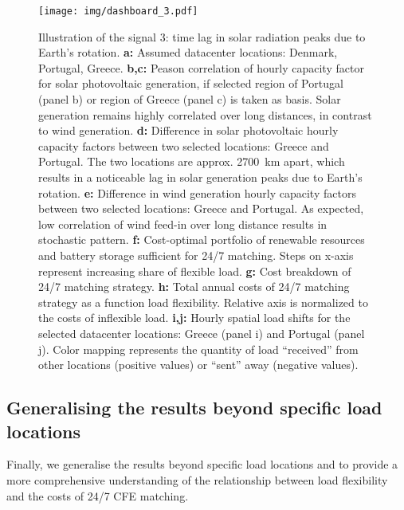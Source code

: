 \begin{figure}
    \centering
    \texttt{[image: img/dashboard\_3.pdf]}
    \caption{Illustration of the signal 3: time lag in solar radiation peaks due to Earth's rotation.
    \textbf{a:} Assumed datacenter locations: Denmark, Portugal, Greece.
    \textbf{b,c:} Peason correlation of hourly capacity factor for solar photovoltaic generation, if selected region of Portugal (panel b) or region of Greece (panel c) is taken as basis. Solar generation remains highly correlated over long distances, in contrast to wind generation.
    \textbf{d:} Difference in solar photovoltaic hourly capacity factors between two selected locations: Greece and Portugal. The two locations are approx. 2700~km apart, which results in a noticeable lag in solar generation peaks due to Earth's rotation.
    \textbf{e:} Difference in wind generation hourly capacity factors between two selected locations: Greece and Portugal. As expected, low correlation of wind feed-in over long distance results in stochastic pattern.
    \textbf{f:} Cost-optimal portfolio of renewable resources and battery storage sufficient for 24/7 matching. Steps on x-axis represent increasing share of flexible load.
    \textbf{g:} Cost breakdown of 24/7 matching strategy.
    \textbf{h:} Total annual costs of 24/7 matching strategy as a function load flexibility. Relative axis is normalized to the costs of inflexible load.
    \textbf{i,j:} Hourly spatial load shifts for the selected datacenter locations: Greece (panel i) and Portugal (panel j). Color mapping represents the quantity of load \enquote{received} from other locations (positive values) or \enquote{sent} away (negative values).}
    \label{fig:dashboard3}
\end{figure}


\subsection{Generalising the results beyond specific load locations}
\label{ssec:section4}

Finally, we generalise the results beyond specific load locations and to provide a more comprehensive understanding of the relationship between load flexibility and the costs of 24/7 CFE matching.

